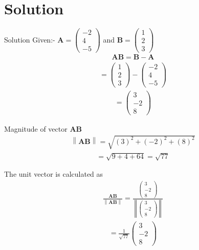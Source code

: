\documentclass{beamer}
\newcommand\norm[1]{\left\lVert#1\right\rVert}
\renewcommand{\vec}[1]{\mathbf{#1}}
\begin{document}
\section{Solution}
\begin{frame}{Solution}
Given:-
$\vec {A}=\begin{pmatrix}-2\\4\\-5\end{pmatrix}$ and
$\vec {B}=\begin{pmatrix}1\\2\\3\end{pmatrix}$
\begin{align}
    \vec{AB}=\vec{B}-\vec{A}
\end{align}
\begin{align}
    =\begin{pmatrix}1\\2\\3\end{pmatrix} - \begin{pmatrix}-2\\4\\-5\end{pmatrix}
\end{align}
\begin{align}
     =\begin{pmatrix}3\\-2\\8\end{pmatrix}
\end{align}
\end{frame}
\begin{frame}
\newline 
Magnitude of vector $\vec{A}\vec{B}$\\
\begin{align}
{\norm{\vec{A}\vec{B}} =\sqrt{\left(3\right)^2 + \left(-2\right)^2 + \left(8\right)^2}}
\end{align}
\begin{align}
    =\sqrt{9+4+64}=\sqrt{77}
    \end{align}
 \end{frame}
\begin{frame}
The unit vector is calculated as
\begin{align}
\frac{\vec{AB}}{\norm{\vec{AB}}}=\frac{\begin{pmatrix}3\\-2\\8\end{pmatrix}}{\norm{\begin{pmatrix}3\\-2\\8\end{pmatrix}}}
\end{align}
\begin{align}
    =\frac{1}{\sqrt{77}}\begin{pmatrix}3\\-2\\8\end{pmatrix}
\end{align}
    
 \end{frame}
\end{document}
